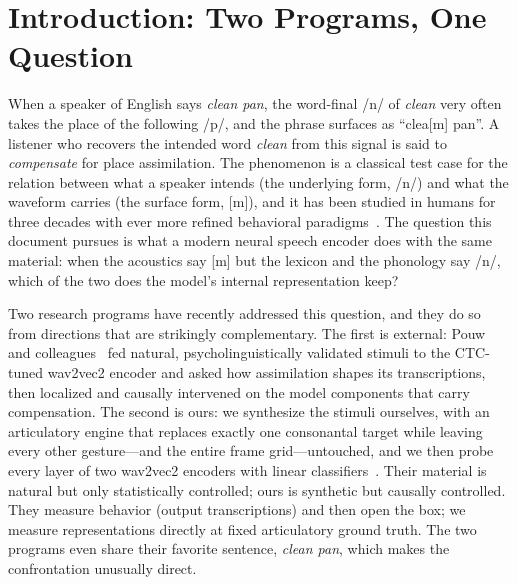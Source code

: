 \documentclass[11pt,a4paper]{article}
\begin{document}
\needspace{0.22\textheight}
\section{Introduction: Two Programs, One Question}\label{sec:intro}

When a speaker of English says \emph{clean pan}, the word-final /n/ of
\emph{clean} very often takes the place of the following /p/, and the
phrase surfaces as ``clea[m] pan''. A listener who recovers the intended
word \emph{clean} from this signal is said to \emph{compensate} for
place assimilation. The phenomenon is a classical test case for the
relation between what a speaker intends (the underlying form, /n/) and
what the waveform carries (the surface form, [m]), and it has been
studied in humans for three decades with ever more refined behavioral
paradigms~\citep{gaskell1996,gmw2001,gaow2002,darcy2009}. The question
this document pursues is what a modern neural speech encoder does with
the same material: when the acoustics say [m] but the lexicon and the
phonology say /n/, which of the two does the model's internal
representation keep?

Two research programs have recently addressed this question, and they
do so from directions that are strikingly complementary. The first is
external: Pouw and colleagues~\citep{pouw2024} fed natural,
psycholinguistically validated stimuli to the CTC-tuned wav2vec2
encoder and asked how assimilation shapes its transcriptions, then
localized and causally intervened on the model components that carry
compensation. The second is ours: we synthesize the stimuli ourselves,
with an articulatory engine that replaces exactly one consonantal
target while leaving every other gesture---and the entire frame
grid---untouched, and we then probe every layer of two wav2vec2
encoders with linear classifiers~\citep{berthommier2026,birkholz2013}.
Their material is natural but only statistically controlled; ours is
synthetic but causally controlled. They measure behavior (output
transcriptions) and then open the box; we measure representations
directly at fixed articulatory ground truth. The two programs even
share their favorite sentence, \emph{clean pan}, which makes the
confrontation unusually direct.
\end{document}
